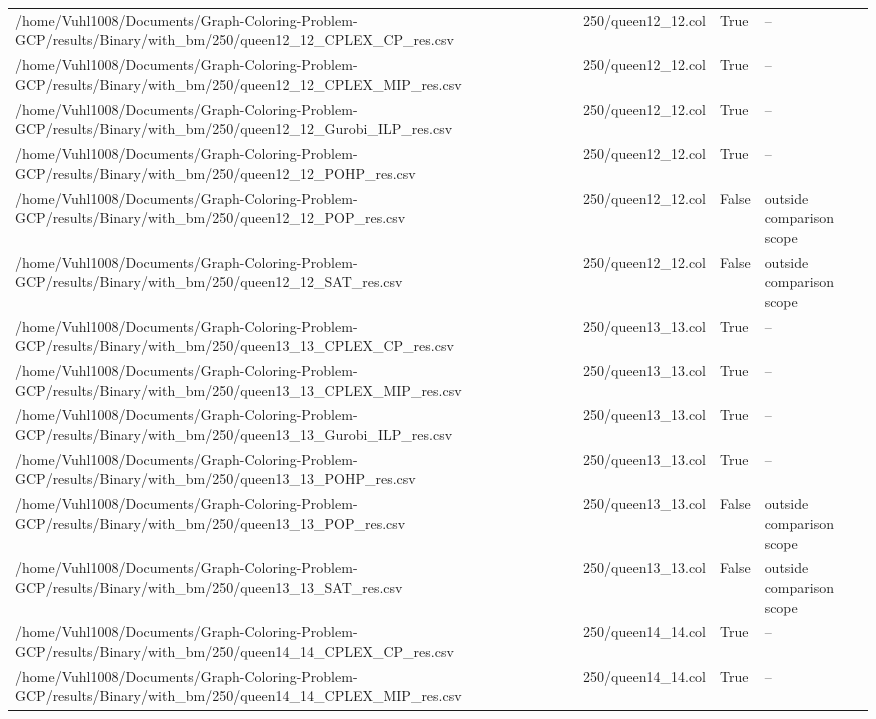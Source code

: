 \begin{table}[htbp]
\begin{tabular}{llll}
/home/Vuhl1008/Documents/Graph-Coloring-Problem-GCP/results/Binary/with\_bm/250/queen12\_12\_CPLEX\_CP\_res.csv & 250/queen12\_12.col & True & -- \\
/home/Vuhl1008/Documents/Graph-Coloring-Problem-GCP/results/Binary/with\_bm/250/queen12\_12\_CPLEX\_MIP\_res.csv & 250/queen12\_12.col & True & -- \\
/home/Vuhl1008/Documents/Graph-Coloring-Problem-GCP/results/Binary/with\_bm/250/queen12\_12\_Gurobi\_ILP\_res.csv & 250/queen12\_12.col & True & -- \\
/home/Vuhl1008/Documents/Graph-Coloring-Problem-GCP/results/Binary/with\_bm/250/queen12\_12\_POHP\_res.csv & 250/queen12\_12.col & True & -- \\
/home/Vuhl1008/Documents/Graph-Coloring-Problem-GCP/results/Binary/with\_bm/250/queen12\_12\_POP\_res.csv & 250/queen12\_12.col & False & outside comparison scope \\
/home/Vuhl1008/Documents/Graph-Coloring-Problem-GCP/results/Binary/with\_bm/250/queen12\_12\_SAT\_res.csv & 250/queen12\_12.col & False & outside comparison scope \\
/home/Vuhl1008/Documents/Graph-Coloring-Problem-GCP/results/Binary/with\_bm/250/queen13\_13\_CPLEX\_CP\_res.csv & 250/queen13\_13.col & True & -- \\
/home/Vuhl1008/Documents/Graph-Coloring-Problem-GCP/results/Binary/with\_bm/250/queen13\_13\_CPLEX\_MIP\_res.csv & 250/queen13\_13.col & True & -- \\
/home/Vuhl1008/Documents/Graph-Coloring-Problem-GCP/results/Binary/with\_bm/250/queen13\_13\_Gurobi\_ILP\_res.csv & 250/queen13\_13.col & True & -- \\
/home/Vuhl1008/Documents/Graph-Coloring-Problem-GCP/results/Binary/with\_bm/250/queen13\_13\_POHP\_res.csv & 250/queen13\_13.col & True & -- \\
/home/Vuhl1008/Documents/Graph-Coloring-Problem-GCP/results/Binary/with\_bm/250/queen13\_13\_POP\_res.csv & 250/queen13\_13.col & False & outside comparison scope \\
/home/Vuhl1008/Documents/Graph-Coloring-Problem-GCP/results/Binary/with\_bm/250/queen13\_13\_SAT\_res.csv & 250/queen13\_13.col & False & outside comparison scope \\
/home/Vuhl1008/Documents/Graph-Coloring-Problem-GCP/results/Binary/with\_bm/250/queen14\_14\_CPLEX\_CP\_res.csv & 250/queen14\_14.col & True & -- \\
/home/Vuhl1008/Documents/Graph-Coloring-Problem-GCP/results/Binary/with\_bm/250/queen14\_14\_CPLEX\_MIP\_res.csv & 250/queen14\_14.col & True & -- \\

\end{tabular}
\end{table}
